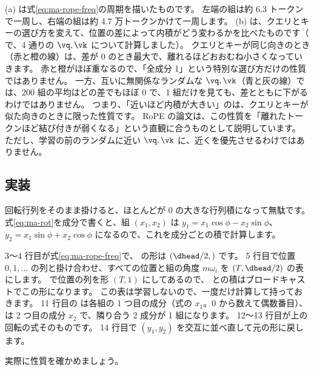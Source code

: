 (a) は式\eqref{eq:ma-rope-freq}の周期を描いたものです。
左端の組は約 6.3 トークンで一周し、右端の組は約 4.7 万トークンかけて一周します。
(b) は、クエリとキーの選び方を変えて、位置の差によって内積がどう変わるかを比べたものです（ で、4 通りの $\vq,\vk$ について計算しました）。
クエリとキーが同じ向きのとき（赤と橙の線）は、差が 0 のとき最大で、離れるほどおおむね小さくなっていきます。
赤と橙がほぼ重なるので、「全成分 1」という特別な選び方だけの性質ではありません。
一方、互いに無関係なランダムな $\vq,\vk$（青と灰の線）では、200 組の平均はどの差でもほぼ 0 で、1 組だけを見ても、差とともに下がるわけではありません。
つまり、「近いほど内積が大きい」のは、クエリとキーが似た向きのときに限った性質です。
RoPE の論文は、この性質を「離れたトークンほど結び付きが弱くなる」という直観に合うものとして説明しています\cite{su2024roformer}。
ただし、学習の前のランダムに近い $\vq,\vk$ に、近くを優先させるわけではありません。

\subsection*{実装}

回転行列をそのまま掛けると、ほとんどが 0 の大きな行列積になって無駄です。
式\eqref{eq:ma-rot}を成分で書くと、組 $(x_1,x_2)$ は
$y_1=x_1\cos\phi-x_2\sin\phi$、$y_2=x_1\sin\phi+x_2\cos\phi$
になるので、これを成分ごとの積で計算します。


3〜4 行目が式\eqref{eq:ma-rope-freq}で、 の形は $(\dhead/2,)$ です。
5 行目で位置 $0,1,\dots$ の列と掛け合わせ、すべての位置と組の角度 $m\omega_i$ を $(T,\dhead/2)$ の表にします。
\code{[:, None]} で位置の列を形 $(T,1)$ にしてあるので、 との積はブロードキャストでこの形になります。
この表は学習しないので、一度だけ計算して持っておきます。
11 行目の  は各組の 1 つ目の成分（式の $x_1$。0 から数えて偶数番目）、 は 2 つ目の成分 $x_2$ で、隣り合う 2 成分が 1 組になります。
12〜13 行目が上の回転の式そのものです。
14 行目で $(y_1,y_2)$ を交互に並べ直して元の形に戻します。

実際に性質を確かめましょう。


